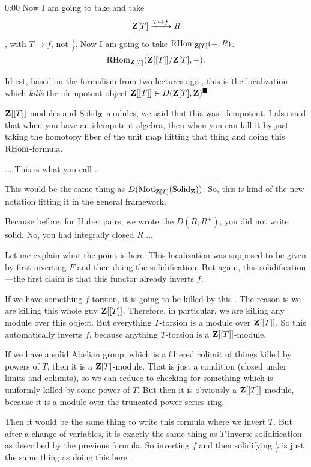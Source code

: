 \begin{unfinished}{0:00}
Now I am going to take and take
\[
\mathbf Z[T] \xrightarrow{T \mapsto f} R
\],
with $T \mapsto f$, not $\frac{1}{f}$.
Now I am going to take $\operatorname{RHom}_{\mathbf Z[T]}(-, R)$.
\[
\operatorname{RHom}_{\mathbf Z[T]}( \mathbf Z[[T]] / \mathbf Z[T], -).
\]

Id est, based on the formalism from two lectures ago , this is the localization which \emph{kills} the idempotent object $\mathbf Z[[T]] \in D (\mathbf Z[T], \mathbf Z)^\blacksquare$.

$\mathbf Z[[T]]$-modules and $\mathrm{Solid}_\mathbf Z$-modules, we said that this was idempotent. I also said that when you have an idempotent algebra, then when you can kill it by just taking the homotopy fiber of the unit map  hitting that thing and doing this $\operatorname{RHom}$-formula.

\gabber ...  This is what you call ..

\ans This would be the same thing as $D(\operatorname{Mod}_{\mathbf Z[T]}(\mathrm{Solid}_\mathbf Z))$. So, this is kind of the new notation fitting it in the general framework. 

\gabber Because before, for Huber pairs, we wrote the $D(R, R^+)$, you did not write solid.  No, you had integrally closed $R$ ... 

\ans Let me explain what the point is here. This  localization was supposed to be given by first inverting $F$ and then doing the solidification. 
But again, this solidification---the first claim is that this functor  already inverts $f$. 

If we have something $f$-torsion, it is going to be killed by this . The reason is we are killing this whole guy $\mathbf Z[[T]]$. Therefore, in particular, we are killing any module over this object. But everything $T$-torsion is a module over $\mathbf Z[[T]]$.
So this automatically inverts $f$, because anything $T$-torsion is a $\mathbf Z[[T]]$-module.

If we have a solid Abelian group, which is a filtered colimit of things killed by powers of $T$, then it is a $\mathbf Z[T]$-module. 
That is just a condition (closed under limits and colimits), so we can reduce to checking for something which is uniformly killed by some power of $T$. But then it is obviously a $\mathbf Z[[T]]$-module, because it is a module over the truncated power series ring.

Then it would be the same thing to write this formula  where we invert $T$. But after a change of variables, it is exactly the same thing as $T$ inverse-solidification as described by the previous formula. 
So inverting $f$ and then solidifying $\frac{1}{f}$ is just the same thing as doing this here .


\end{unfinished}
